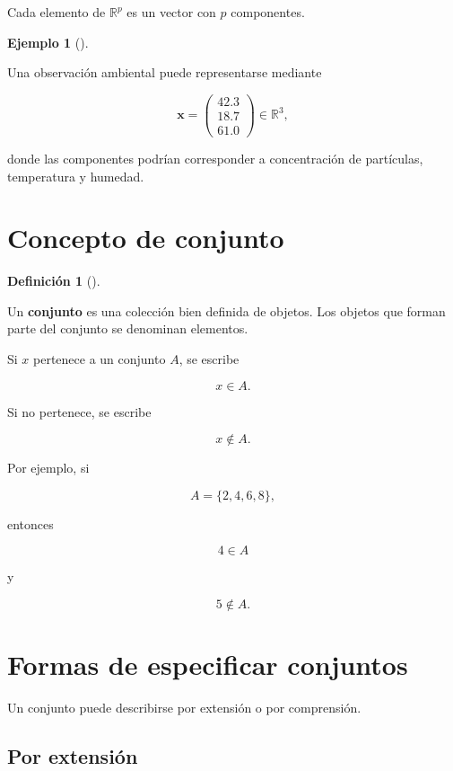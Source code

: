 \documentclass[
  spanish,
  11pt,
  letterpaper,
  DIV=11,
  numbers=noendperiod]{scrreprt}
\theoremstyle{definition}
\newtheorem{definition}{Definición}[chapter]
\theoremstyle{plain}
\theoremstyle{definition}
\newtheorem{example}{Ejemplo}[chapter]
\theoremstyle{remark}
\begin{document}
Cada elemento de \(\mathbb{R}^{p}\) es un vector con \(p\) componentes.

\begin{example}[]\protect\hypertarget{exm-vector-caracteristicas}{}\label{exm-vector-caracteristicas}

Una observación ambiental puede representarse mediante

\[
\mathbf{x}
=
\begin{pmatrix}
42.3\\
18.7\\
61.0
\end{pmatrix}
\in\mathbb{R}^{3},
\]

donde las componentes podrían corresponder a concentración de
partículas, temperatura y humedad.

\end{example}

\section{Concepto de conjunto}\label{concepto-de-conjunto}

\begin{definition}[]\protect\hypertarget{def-conjunto}{}\label{def-conjunto}

Un \textbf{conjunto} es una colección bien definida de objetos. Los
objetos que forman parte del conjunto se denominan elementos.

\end{definition}

Si \(x\) pertenece a un conjunto \(A\), se escribe

\[
x\in A.
\]

Si no pertenece, se escribe

\[
x\notin A.
\]

Por ejemplo, si

\[
A=\{2,4,6,8\},
\]

entonces

\[
4\in A
\]

y

\[
5\notin A.
\]

\section{Formas de especificar
conjuntos}\label{formas-de-especificar-conjuntos}

Un conjunto puede describirse por extensión o por comprensión.

\subsection{Por extensión}\label{por-extensiuxf3n}
\end{document}
